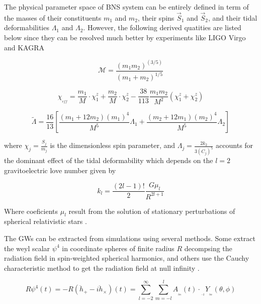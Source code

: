 \FloatBarrier




The physical parameter space of BNS system can be entirely defined  in term of the masses of their constituents $m_1$ and $m_2$, their spins $\vec{S}_1$ and $\vec{S}_2$, and their tidal deformabilities $\Lambda_1$ and $\Lambda_2$\cite{Hinderer:2009ca}. However, the following derived quatities are listed below since they can be resolved much better by experiments like LIGO Virgo and KAGRA

\begin{equation}
\mathcal{M} = \frac{(m_1 m_2)^{(3/5)}}{(m_1 + m_2)^{1/5}}
\end{equation}

\begin{equation}\label{chieff}
\chi_{_{eff}} = \frac{m_1}{M}\cdot \chi_1^z + \frac{m_2}{M}\cdot \chi_2^z - \frac{38}{113} \frac{m_1 m_2}{M^2}(\chi_1^z + \chi_2^z)
\end{equation}


\begin{equation}
\tilde{\Lambda} = \frac{16}{13} \left[ \frac{(m_1 +12m_2)(m_1)^4}{M^5} \Lambda_1 + \frac{(m_2 +12m_1)(m_2)^4}{M^5} \Lambda_2 \right]
\end{equation}

where $\chi_j = \frac{S_j}{m_j}$ is the dimensionless spin parameter, and $\Lambda_j = \frac{2k_2}{3(C_j)^5}$ accounts for the dominant effect of the tidal deformability  which depends on the $l=2$ gravitoelectric love number given by

\begin{equation}
k_l = \frac{(2l-1)!}{2}\frac{G \mu_l}{R^{2l+1}}
\end{equation}

Where coeficients $\mu_l$ result from the solution of stationary perturbations of spherical relativistic stars \cite{PhysRevD.80.084035,PhysRevD.80.084018,PhysRevD.77.021502,2020GReGr..52..108B}.

The GWs can be extracted from simulations using several methods. Some extract the weyl scalar $\psi^4$ in coordinate spheres of finite radius $R$ \cite{Bishop:2016lgv,Thorne:1980ru} decompsing the radiation field in spin-weighted spherical harmonics, and others use the Cauchy characteristic method to get the radiation field at null infinity \cite{Barkett:2019uae}.

\begin{equation}\label{pso}
R\psi^4(t) = - R(\ddot{h}_+ - i\ddot{h}_\times)(t) = \sum_{l=-2}^{\infty}  \sum_{m=-l}^{l} A_{_{_{lm}}}(t) \cdot {}_{_{_{-2}}}Y_{_{_{lm}}}(\theta, \phi)
\end{equation}

